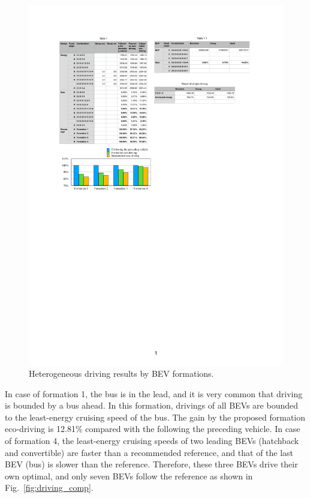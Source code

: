 \documentclass{IEEEtran}
\begin{document}
\begin{figure}	%
\centering
\includegraphics[width=1.0\hsize]{Figures/Bar_graph.pdf}
\caption{Heterogeneous driving results by BEV formations.}
\label{fig:bar_graph}
\end{figure} 



In case of formation 1, the bus is in the lead, and it is very common that driving is bounded by a bus ahead. In this formation, drivings of all BEVs are bounded to the least-energy cruising speed of the bus. The gain by the proposed formation eco-driving is 12.81\% compared with the following the preceding vehicle.
In case of formation 4, the least-energy cruising speeds of two leading BEVs (hatchback and convertible) are faster than a recommended reference, and that of the last BEV (bus) is slower than the reference. Therefore, these three BEVs drive their own optimal, and only seven BEVs follow the reference as shown in Fig.~\ref{fig:driving_comp}.
\end{document}
